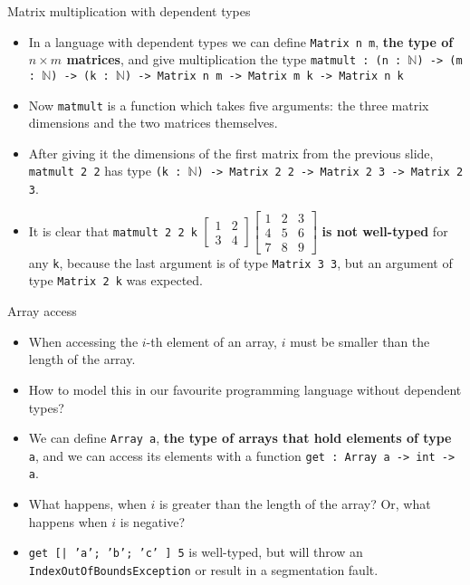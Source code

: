 \documentclass{beamer}
\newcommand{\m}[1]{\texttt{#1}}
\begin{document}
\begin{frame}{Matrix multiplication with dependent types}
\begin{itemize}
	\item In a language with dependent types we can define \m{Matrix n m}, \textbf{the type of $n \times m$ matrices}, and give multiplication the type \m{matmult : (n :\ $\mathbb{N}$) ->  (m :\ $\mathbb{N}$) -> (k :\ $\mathbb{N}$) -> Matrix n m -> Matrix m k -> Matrix n k}
	\item Now \m{matmult} is a function which takes five arguments: the three matrix dimensions and the two matrices themselves.
	\item After giving it the dimensions of the first matrix from the previous slide, \m{matmult 2 2} has type \m{(k :\ $\mathbb{N}$) -> Matrix 2 2 -> Matrix 2 3 -> Matrix 2 3}.
	\item It is clear that \m{matmult 2 2 k} $\begin{bmatrix}1 & 2\\3 & 4\end{bmatrix} \begin{bmatrix}1 & 2 & 3\\4 & 5 & 6\\7 & 8 & 9\end{bmatrix}$ \textbf{is not well-typed} for any \m{k}, because the last argument is of type \m{Matrix 3 3}, but an argument of type \m{Matrix 2 k} was expected.
\end{itemize}
\end{frame}

\begin{frame}{Array access}
\begin{itemize}
	\item When accessing the $i$-th element of an array, $i$ must be smaller than the length of the array.
	\item How to model this in our favourite programming language without dependent types?
	\item We can define \m{Array a}, \textbf{the type of arrays that hold elements of type} \m{a}, and we can access its elements with a function \m{get :\ Array a -> int -> a}.
	\item What happens, when $i$ is greater than the length of the array? Or, what happens when $i$ is negative?
	\item \m{get [| 'a'; 'b'; 'c' ] 5} is well-typed, but will throw an \m{IndexOutOfBoundsException} or result in a segmentation fault.
\end{itemize}
\end{frame}
\end{document}
